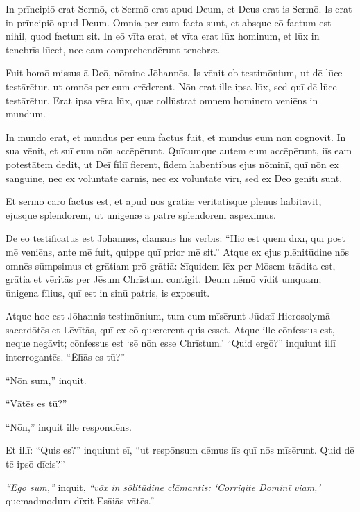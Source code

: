 
\Caput
\Versus In prīncipiō erat Sermō, et Sermō erat apud Deum, et Deus erat is Sermō.
\Versus Is erat in prīncipiō apud Deum.
\Versus Omnia per eum facta sunt, et absque eō factum est nihil, quod factum sit.
\Versus In eō vīta erat, et vīta erat lūx hominum,
\Versus et lūx in tenebrīs lūcet, nec eam comprehendērunt tenebræ.

\Versus Fuit homō missus ā Deō, nōmine Jōhannēs.
\Versus Is vēnit ob testimōnium, ut dē lūce testārētur, ut omnēs per eum crēderent.
\Versus Nōn erat ille ipsa lūx, sed quī dē lūce testārētur.
\Versus Erat ipsa vēra lūx, quæ collūstrat omnem hominem veniēns in mundum.

\Versus In mundō erat, et mundus per eum factus fuit, et mundus eum nōn cognōvit.
\Versus In sua vēnit, et suī eum nōn accēpērunt.
\Versus Quīcumque autem eum accēpērunt, iīs eam potestātem dedit, ut Deī fīliī fierent, fidem habentibus ejus nōminī,
\Versus quī nōn ex sanguine, nec ex voluntāte carnis, nec ex voluntāte virī, sed ex Deō genitī sunt.

\Versus Et sermō carō factus est, et apud nōs grātiæ vēritātisque plēnus habitāvit, ejusque splendōrem, ut ūnigenæ ā patre splendōrem aspeximus.

\Versus Dē eō testificātus est Jōhannēs, clāmāns hīs verbīs: ``Hic est quem dīxī, quī post mē veniēns, ante mē fuit, quippe quī prior mē sit.''
\Versus Atque ex ejus plēnitūdine nōs omnēs sūmpsimus et grātiam prō grātiā:
\Versus Sīquidem lēx per Mōsem trādita est, grātia et vēritās per Jēsum Chrīstum contigit.
\Versus Deum nēmō vīdit umquam; ūnigena fīlius, quī est in sinū patris, is exposuit.

\Versus Atque hoc est Jōhannis testimōnium, tum cum mīsērunt Jūdæī Hierosolymā sacerdōtēs et Lēvītās, quī ex eō quærerent quis esset.
\Versus Atque ille cōnfessus est, neque negāvit; cōnfessus est `sē nōn esse Chrīstum.'
\Versus ``Quid ergō?'' inquiunt illī interrogantēs. ``Ēlīās es tū?''

``Nōn sum,'' inquit.

``Vātēs es tū?''

``Nōn,'' inquit ille respondēns.

\Versus Et illī: ``Quis es?'' inquiunt eī, ``ut respōnsum dēmus iīs quī nōs mīsērunt. Quid dē tē ipsō dīcis?''

\Versus \emph{``Ego sum,''} inquit, \emph{``vōx in sōlitūdine clāmantis: `Corrigite Dominī viam,'} quemadmodum dīxit Ēsāiās vātēs.''


